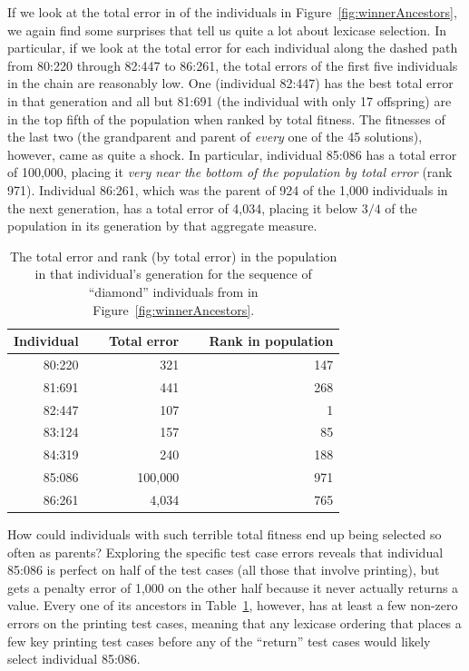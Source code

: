 If we look at the total error in of the individuals in Figure~\ref{fig:winnerAncestors}, we again
find some surprises that tell us quite a lot about lexicase selection. In particular, if
we look at the total error for each individual along the dashed path from 80:220 through
82:447 to 86:261, the total errors of the first five
individuals in the chain are reasonably low. One (individual 82:447) has the best total error in
that generation and all but 81:691 (the individual with only 17 offspring) are in the top fifth of the 
population when ranked by total fitness. The fitnesses 
of the last two (the grandparent and parent of \emph{every} one of the 45 solutions), however, 
came as quite a shock. In particular, individual 85:086 has a total error of 100,000, placing it
\emph{very near the bottom of the population by total error} (rank 971). Individual 86:261, which was
the parent of 924 of the 1,000 individuals in the next generation, has a total error of 4,034, placing
it below $3/4$ of the population in its generation by that aggregate measure.

\begin{table}[t]
	\caption{The total error and rank (by total error) in the population in that individual's generation
		for the sequence of ``diamond'' individuals from in Figure~\ref{fig:winnerAncestors}.}
	\label{table:winnerFitnesses}
	\begin{center}
	\begin{tabular}{rrr}
		Individual & $\quad$ Total error & $\quad$ Rank in population \\
		\hline\noalign{\smallskip}
		80:220 & 321 & 147 \\
		81:691 & 441 & 268 \\
		82:447 & 107 & 1 \\
		83:124 & 157 & 85 \\
		84:319 & 240 & 188 \\
		85:086 & 100,000 & 971 \\
		86:261 & 4,034 & 765
	\end{tabular}
	\end{center}
\end{table}

How could individuals with such terrible total fitness end up being selected so often as parents?
Exploring the specific test case errors reveals that individual 85:086 is perfect on half of the test
cases (all those that involve printing), but gets a penalty error of 1,000 on the other half
because it never actually returns a value. Every one of its ancestors in 
Table~\ref{table:winnerFitnesses}, however, has at least a few non-zero errors on the printing
test cases, meaning that any lexicase ordering that places a few key printing test cases before
any of the ``return'' test cases would likely select individual 85:086.

